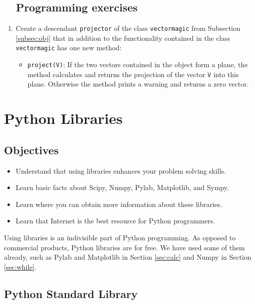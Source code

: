 \subsection{\ \ Programming exercises}

\begin{enumerate}
\item Create a descendant {\tt projector} of the class {\tt vectormagic} from Subsection \ref{subsec:obj}
      that in addition to the functionality contained in the class {\tt vectormagic} has one new
      method:
\begin{itemize}
\item {\tt project(V)}: If the two vectors contained in the object form a plane, the 
      method calculates and returns the projection of the vector {\tt V} into this plane. 
      Otherwise the method prints a warning and returns a zero vector. 
\end{itemize}
\end{enumerate}


\section{Python Libraries}\label{subsec:importinglib}

\subsection{Objectives}

\begin{itemize}
\item Understand that using libraries enhances your problem solving skills.
\item Learn basic facts about Scipy, Numpy, Pylab, Matplotlib, and Sympy.
\item Learn where you can obtain more information about these libraries.
\item Learn that Internet is the best resource for Python programmers.
\end{itemize}
Using libraries is an indivisible part of Python programming. As opposed to 
commercial products, Python libraries are for free. We have used some of them
already, such as Pylab and Matplotlib in Section \ref{sec:calc} and Numpy 
in Section \ref{sec:while}. 

\subsection{Python Standard Library}

